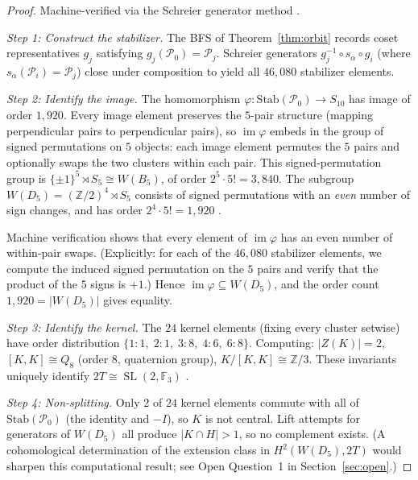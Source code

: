 \documentclass[11pt,reqno]{amsart}
\theoremstyle{plain}
\theoremstyle{definition}
\theoremstyle{remark}
\newcommand{\Z}{\mathbb{Z}}
\newcommand{\F}{\mathbb{F}}
\newcommand{\Stab}{\mathrm{Stab}}
\DeclareMathOperator{\SL}{SL}
\begin{document}
\begin{proof}
Machine-verified via the Schreier generator method
\cite{Sims1970}.

\emph{Step 1: Construct the stabilizer.}
The BFS of Theorem~\ref{thm:orbit} records coset representatives
$g_j$ satisfying $g_j(\mathcal{P}_0) = \mathcal{P}_j$.
Schreier generators $g_j^{-1} \circ s_\alpha \circ g_i$
(where $s_\alpha(\mathcal{P}_i) = \mathcal{P}_j$) close
under composition to yield all $46{,}080$ stabilizer elements.

\emph{Step 2: Identify the image.}
The homomorphism
$\varphi \colon \Stab(\mathcal{P}_0) \to S_{10}$
has image of order $1{,}920$.
Every image element preserves the $5$-pair structure
(mapping perpendicular pairs to perpendicular pairs),
so $\operatorname{im}\varphi$ embeds in the group of
signed permutations on $5$ objects: each image element
permutes the $5$ pairs and optionally swaps the two
clusters within each pair.
This signed-permutation group is $\{\pm 1\}^5 \rtimes S_5
\cong W(B_5)$, of order $2^5 \cdot 5! = 3{,}840$.
The subgroup $W(D_5) = (\Z/2)^4 \rtimes S_5$ consists
of signed permutations with an \emph{even} number of
sign changes, and has order $2^4 \cdot 5! = 1{,}920$
\cite{Humphreys1990}.

Machine verification shows that every element of
$\operatorname{im}\varphi$ has an even number of
within-pair swaps.
(Explicitly: for each of the $46{,}080$ stabilizer
elements, we compute the induced signed permutation on
the $5$ pairs and verify that the product of the $5$
signs is $+1$.)
Hence $\operatorname{im}\varphi \subseteq W(D_5)$,
and the order count $1{,}920 = |W(D_5)|$ gives equality.

\emph{Step 3: Identify the kernel.}
The $24$ kernel elements (fixing every cluster setwise)
have order distribution
$\{1{:}1,\; 2{:}1,\; 3{:}8,\; 4{:}6,\; 6{:}8\}$.
Computing:
$|Z(K)| = 2$,
$[K,K] \cong Q_8$ (order $8$, quaternion group),
$K/[K,K] \cong \Z/3$.
These invariants uniquely identify $2T \cong \SL(2,\F_3)$
\cite{ConwaySloanePlesken1988}.

\emph{Step 4: Non-splitting.}
Only $2$ of $24$ kernel elements commute with all of
$\Stab(\mathcal{P}_0)$ (the identity and $-I$),
so $K$ is not central.
Lift attempts for generators of $W(D_5)$ all produce
$|K \cap H| > 1$, so no complement exists.
(A cohomological determination of the extension class in
$H^2(W(D_5), 2T)$ would sharpen this computational result;
see Open Question~1 in Section~\ref{sec:open}.)
\end{proof}
\end{document}
